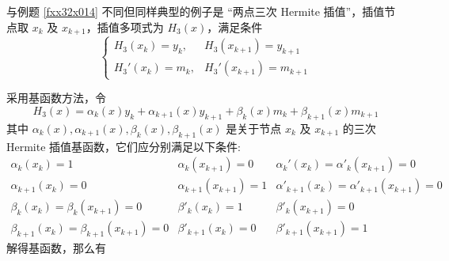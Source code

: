 
与例题 \ref{fxx32x014} 不同但同样典型的例子是 “两点三次 Hermite 插值”，插值节点取 $x_k$ 及 $x_{k+1}$，插值多项式为 $H_3(x)$，满足条件
$$\begin{cases}
        H_3(x_k)=y_k,  & H_3(x_{k+1})=y_{k+1}  \\
        H_3'(x_k)=m_k, & H_3'(x_{k+1})=m_{k+1}
    \end{cases}$$

\begin{theorem}
    \label{twoPointTripleHermiteInterpolation}
    采用基函数方法，令 $$H_3(x)=\alpha_k(x)y_k+\alpha_{k+1}(x)y_{k+1}+\beta_k(x)m_k+\beta_{k+1}(x)m_{k+1}$$
    其中 $\alpha_k(x),\alpha_{k+1}(x),\beta_k(x),\beta_{k+1}(x)$ 是关于节点 $x_k$ 及 $x_{k+1}$ 的三次 Hermite 插值基函数，它们应分别满足以下条件:
    $$\begin{array}{lll}
            \alpha _k(x_k)=1                        & \alpha _k(x_{k+1})=0     & \alpha _k'(x_k)=\alpha '_k(x_{k+1})=0         \\
            \alpha _{k+1}(x_k)=0                    & \alpha _{k+1}(x_{k+1})=1 & \alpha' _{k+1}(x_k)=\alpha '_{k+1}(x_{k+1})=0 \\
            \beta_k(x_k)=\beta_k(x_{k+1})=0         & \beta'_k(x_k)=1          & \beta'_k(x_{k+1})=0                           \\
            \beta_{k+1}(x_k)=\beta_{k+1}(x_{k+1})=0 & \beta'_{k+1}(x_k)=0      & \beta'_{k+1}(x_{k+1})=1
        \end{array}$$
    解得基函数，那么有
\end{theorem}

